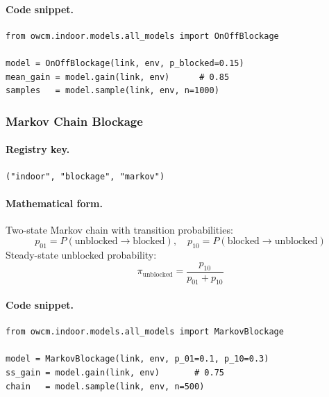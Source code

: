 \documentclass[11pt,a4paper]{article}
\begin{document}
\paragraph{Code snippet.}
\begin{lstlisting}
from owcm.indoor.models.all_models import OnOffBlockage

model = OnOffBlockage(link, env, p_blocked=0.15)
mean_gain = model.gain(link, env)      # 0.85
samples   = model.sample(link, env, n=1000)
\end{lstlisting}

\subsubsection{Markov Chain Blockage}
\label{sec:markov_blockage}

\paragraph{Registry key.} \texttt{("indoor", "blockage", "markov")}

\paragraph{Mathematical form.}
Two-state Markov chain with transition probabilities:
\begin{equation}
p_{01} = P(\text{unblocked} \to \text{blocked}), \quad
p_{10} = P(\text{blocked} \to \text{unblocked})
\end{equation}
Steady-state unblocked probability:
\begin{equation}
\boxed{\pi_{\text{unblocked}} = \frac{p_{10}}{p_{01} + p_{10}}}
\end{equation}

\paragraph{Code snippet.}
\begin{lstlisting}
from owcm.indoor.models.all_models import MarkovBlockage

model = MarkovBlockage(link, env, p_01=0.1, p_10=0.3)
ss_gain = model.gain(link, env)       # 0.75
chain   = model.sample(link, env, n=500)
\end{lstlisting}


\newpage
\end{document}
